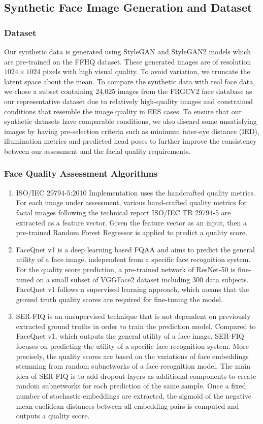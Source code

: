 \documentclass[12pt]{article}
\begin{document}
\subsection{Synthetic Face Image Generation and Dataset}
\subsubsection{Dataset}
Our synthetic data is generated
using StyleGAN and StyleGAN2 models which are
pre-trained on the FFHQ dataset. These generated images
are of resolution $1024 \times 1024$ pixels with high visual quality. To avoid variation, we truncate the latent space about the mean. To compare the synthetic data with real face data, we
chose a subset containing 24,025 images from the FRGCV2 face database as our representative dataset due to
relatively high-quality images and constrained conditions that
resemble the image quality in EES cases. To ensure that our
synthetic datasets have comparable conditions, we also discard
some unsatisfying images by having pre-selection criteria such
as minimum inter-eye distance (IED), illumination metrics
and predicted head poses to further improve the consistency
between our assessment and the facial quality requirements.
\subsubsection{Face Quality Assessment Algorithms}
\begin{enumerate}
  \item ISO/IEC 29794-5:2010 Implementation uses the handcrafted quality metrics. For each image under assessment, various hand-crafted
  quality metrics for facial images following the technical report
  ISO/IEC TR 29794-5 are extracted as a feature vector. Given
  the feature vector as an input, then a pre-trained Random
  Forest Regressor is applied to predict a quality score.
  \item FaceQnet v1 is a deep learning based FQAA and aims to predict the
  general utility of a face image, independent from a specific
  face recognition system. For the quality score prediction, a
  pre-trained network of ResNet-50 is fine-tuned on a small
  subset of VGGFace2 dataset including 300 data subjects. FaceQnet v1 follows a supervised learning approach, which
  means that the ground truth quality scores are required for
  fine-tuning the model. 
  \item SER-FIQ is an unsupervised
  technique that is not dependent on previously extracted ground
  truths in order to train the prediction model. Compared to
  FaceQnet v1, which outputs the general utility of a face image,
  SER-FIQ focuses on predicting the utility of a specific face
  recognition system. More precisely, the quality scores are
  based on the variations of face embeddings stemming from
  random subnetworks of a face recognition model. The main idea of SER-FIQ is to
add dropout layers as additional components to create random
subnetworks for each prediction of the same sample. Once
a fixed number of stochastic embeddings are extracted, the
sigmoid of the negative mean euclidean distances between
all embedding pairs is computed and outputs a quality score. 
\end{enumerate}
\end{document}
